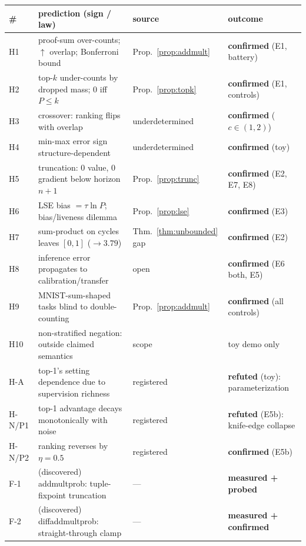 \documentclass[10pt]{article}
\theoremstyle{remark}
\newcommand{\statusgood}[1]{\textbf{#1}}
\begin{document}
\begin{center}\small
\begin{tabular}{llll}
\toprule
\# & prediction (sign / law) & source & outcome\\
\midrule
H1 & proof-sum over-counts; $\uparrow$ overlap; Bonferroni bound & Prop.~\ref{prop:addmult} &
\statusgood{confirmed} (E1, battery)\\
H2 & top-$k$ under-counts by dropped mass; $0$ iff $P \le k$ & Prop.~\ref{prop:topk} &
\statusgood{confirmed} (E1, controls)\\
H3 & crossover: ranking flips with overlap & underdetermined & \statusgood{confirmed}
($c \in (1,2)$)\\
H4 & min-max error sign structure-dependent & underdetermined & \statusgood{confirmed} (toy)\\
H5 & truncation: $0$ value, $0$ gradient below horizon $n{+}1$ & Prop.~\ref{prop:trunc} &
\statusgood{confirmed} (E2, E7, E8)\\
H6 & LSE bias $= \tau\ln P$; bias/liveness dilemma & Prop.~\ref{prop:lse} &
\statusgood{confirmed} (E3)\\
H7 & sum-product on cycles leaves $[0,1]$ ($\to 3.79$) & Thm.~\ref{thm:unbounded} gap &
\statusgood{confirmed} (E2)\\
H8 & inference error propagates to calibration/transfer & open & \statusgood{confirmed}
(E6 both, E5)\\
H9 & MNIST-sum-shaped tasks blind to double-counting & Prop.~\ref{prop:addmult} &
\statusgood{confirmed} (all controls)\\
H10 & non-stratified negation: outside claimed semantics & scope & toy demo only\\
H-A & top-1's setting dependence due to supervision richness & registered &
\textbf{refuted} (toy): parameterization\\
H-N/P1 & top-1 advantage decays monotonically with noise & registered & \textbf{refuted} (E5b):
knife-edge collapse\\
H-N/P2 & ranking reverses by $\eta = 0.5$ & registered & \statusgood{confirmed} (E5b)\\
F-1 & (discovered) addmultprob: tuple-fixpoint truncation & --- & \statusgood{measured + probed}\\
F-2 & (discovered) diffaddmultprob: straight-through clamp & --- & \statusgood{measured + confirmed}\\
\bottomrule
\end{tabular}
\end{center}
\end{document}
